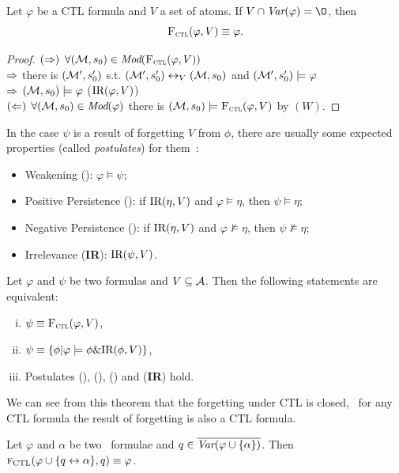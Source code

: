 \documentclass{article}
\begin{document}
\begin{proposition}\label{pro:IR_V:forget}
Let $\varphi$ be a CTL formula and $V$ a set of atoms. If $V \cap \Var(\varphi) = {\O}$, then
\[
{\textsc{F}_{\textsc{ctl}}}(\varphi,V) \equiv \varphi.
\]
\end{proposition}
\begin{proof}
 $(\Rightarrow)$ $\forall ({\cal M}, s_0) \in \textit{Mod}({\textsc{F}_{\textsc{ctl}}}(\varphi,V))$ \\ $\Rightarrow$ there is $({\cal M}', s_0')$ s.t. $({\cal M}', s_0')\leftrightarrow_V ({\cal M}, s_0)$ and $({\cal M}', s_0') \models \varphi$ \\
 $\Rightarrow$ $({\cal M}, s_0) \models \varphi$ \hfill ($\textrm{IR}(\varphi, V)$)\\

 $(\Leftarrow)$ $\forall ({\cal M}, s_0)\in \textit{Mod}(\varphi)$ there is $({\cal M}, s_0) \models {\textsc{F}_{\textsc{ctl}}}(\varphi, V)$ by $(W)$.
\end{proof}

In the case $\psi$ is a result of forgetting $V$ from $\phi$, there are usually some
expected properties (called {\em postulates}) for them~\cite{Yan:AIJ:2009}:
\begin{itemize}
  \item Weakening (\W): $\varphi \models \psi$;
  \item Positive Persistence (\PP):
    if $\textrm{IR}(\eta, V)$ and $\varphi \models \eta$, then $\psi \models \eta$;
  \item Negative Persistence (\NgP): if $\textrm{IR}(\eta, V)$ and $\varphi \nvDash \eta$, then $\psi \nvDash \eta$;
  \item Irrelevance (\textbf{IR}): $\textrm{IR}(\psi, V)$.
\end{itemize}


\begin{theorem}\label{thm:close}
Let $\varphi$ and $\psi$ be two formulas and $V \subseteq {\cal A}$.
Then the following statements are equivalent:
\begin{enumerate}[(i)]
  \item $\psi \equiv {\textsc{F}_{\textsc{ctl}}}(\varphi, V)$,
  \item $\psi \equiv \{\phi | \varphi \models \phi \& \textrm{IR}(\phi, V)\}$,
  \item Postulates (\W), (\PP), (\NgP) and (\textbf{IR}) hold.
\end{enumerate}
\end{theorem}
We can see from this theorem that the forgetting under CTL is closed, \ie\ for any CTL formula the result of forgetting is also a CTL formula.


\begin{lemma}\label{lem:KF:eq}
	Let $\varphi$ and $\alpha$ be two \CTL\ formulae and $q\in
		\overline{\textit{Var}(\varphi\cup\{\alpha\})}$. Then
	${\textsc{f}_{\textrm{CTL}}}(\varphi \cup\{q\leftrightarrow\alpha\}, q)\equiv \varphi$.
\end{lemma}
\end{document}

